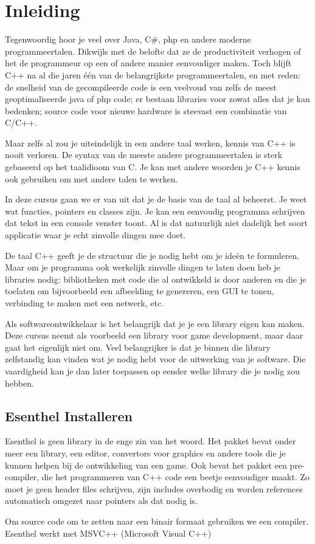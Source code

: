 \chapter{Inleiding}

Tegenwoordig hoor je veel over Java, C\#, php en andere moderne programmeertalen. Dikwijls met de belofte dat ze de productiviteit verhogen of het de programmeur op een of andere manier eenvoudiger maken. Toch blijft C++ na al die jaren \'e\'en van de belangrijkste programmeertalen, en met reden: de snelheid van de gecompileerde code is een veelvoud van zelfs de meest geoptimaliseerde java of php code; er bestaan libraries voor zowat alles dat je kan bedenken; source code voor nieuwe hardware is steevast een combinatie van C/C++. 

Maar zelfs al zou je uiteindelijk in een andere taal werken, kennis van C++ is nooit verloren. De syntax van de meeste andere programmeertalen is sterk gebaseerd op het taalidioom van C. Je kan met andere woorden je C++ kennis ook gebruiken om met andere talen te werken.

In deze cursus gaan we er van uit dat je de basis van de taal al beheerst. Je weet wat functies, pointers en classes zijn. Je kan een eenvoudig programma schrijven dat tekst in een console venster toont. Al is dat natuurlijk niet dadelijk het soort applicatie waar je echt zinvolle dingen mee doet.

De taal C++ geeft je de structuur die je nodig hebt om je ide\"en te formuleren. Maar om je programma ook werkelijk zinvolle dingen te laten doen heb je libraries nodig: bibliotheken met code die al ontwikkeld is door anderen en die je toelaten om bijvoorbeeld een afbeelding te genereren, een GUI te tonen, verbinding te maken met een netwerk, etc. 

Als softwareontwikkelaar is het belangrijk dat je je een library eigen kan maken. Deze cursus neemt als voorbeeld een library voor game development, maar daar gaat het eigenlijk niet om. Veel belangrijker is dat je binnen die library zelfstandig kan vinden wat je nodig hebt voor de uitwerking van je software. Die vaardigheid kan je dan later toepassen op eender welke library die je nodig zou hebben.

\section{Esenthel Installeren}

Esenthel is geen library in de enge zin van het woord. Het pakket bevat onder meer een library, een editor, convertors voor graphics en andere tools die je kunnen helpen bij de ontwikkeling van een game. Ook bevat het pakket een pre-compiler, die het programmeren van C++ code een beetje eenvoudiger maakt. Zo moet je geen header files schrijven, zijn includes overbodig en worden references automatisch omgezet naar pointers als dat nodig is.

Om source code om te zetten naar een binair formaat gebruiken we een compiler. Esenthel werkt met MSVC++ (Microsoft Visual C++)